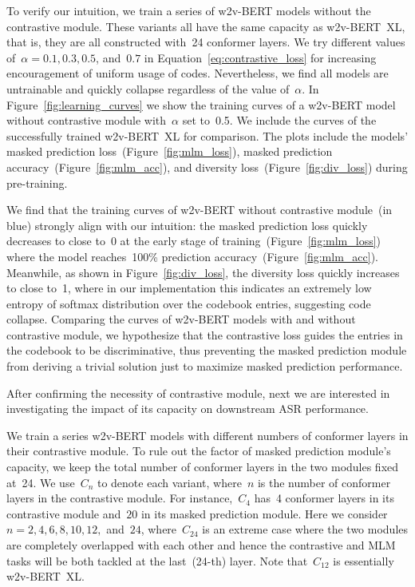\documentclass{article}
\begin{document}
To verify our intuition, we train a series of w2v-BERT models without the contrastive module.
These variants all have the same capacity as w2v-BERT~XL, that is, they are all constructed with~24 conformer layers.
We try different values of~$\alpha = 0.1, 0.3, 0.5$, and~$0.7$ in Equation~\ref{eq:contrastive_loss} for increasing encouragement of uniform usage of codes.
Nevertheless, we find all models are untrainable and quickly collapse regardless of the value of~$\alpha$.
In Figure~\ref{fig:learning_curves} we show the training curves of a w2v-BERT model without contrastive module with~$\alpha$ set to~0.5.
We include the curves of the successfully trained w2v-BERT~XL for comparison.
The plots include the models' masked prediction loss~(Figure~\ref{fig:mlm_loss}), masked prediction accuracy~(Figure~\ref{fig:mlm_acc}), and diversity loss~(Figure~\ref{fig:div_loss}) during pre-training.

We find that the training curves of w2v-BERT without contrastive module~(in blue) strongly align with our intuition: the masked prediction loss quickly decreases to close to~0 at the early stage of training~(Figure~\ref{fig:mlm_loss}) where the model reaches~100\% prediction accuracy~(Figure~\ref{fig:mlm_acc}).
Meanwhile, as shown in Figure~\ref{fig:div_loss}, the diversity loss quickly increases to close to~1, where in our implementation this indicates an extremely low entropy of softmax distribution over the codebook entries, suggesting code collapse.
Comparing the curves of w2v-BERT models with and without contrastive module, we hypothesize that the contrastive loss guides the entries in the codebook to be discriminative, thus preventing the masked prediction module from deriving a trivial solution just to maximize masked prediction performance.

After confirming the necessity of contrastive module, next we are interested in investigating the impact of its capacity on downstream ASR performance.

We train a series w2v-BERT models with different numbers of conformer layers in their contrastive module.
To rule out the factor of masked prediction module's capacity, we keep the total number of conformer layers in the two modules fixed at~24.
We use~$C_{n}$ to denote each variant, where~$n$ is the number of conformer layers in the contrastive module.
For instance,~$C_{4}$ has~4 conformer layers in its contrastive module and~$20$ in its masked prediction module.
Here we consider~$n = 2, 4, 6, 8, 10, 12,$ and~$24$, where~$C_{24}$ is an extreme case where the two modules are completely overlapped with each other and hence the contrastive and MLM tasks will be both tackled at the last~(24-th) layer.
Note that~$C_{12}$ is essentially w2v-BERT~XL.
\end{document}
